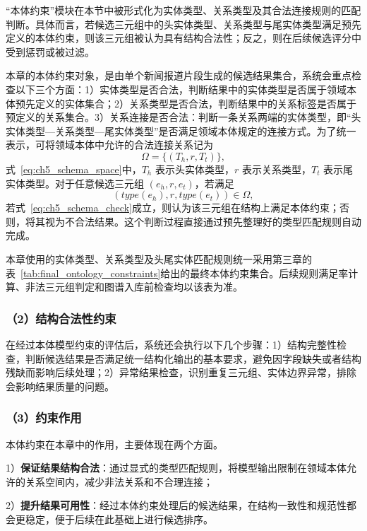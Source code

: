 “本体约束”模块在本节中被形式化为实体类型、关系类型及其合法连接规则的匹配判断。具体而言，若候选三元组中的头实体类型、关系类型与尾实体类型满足预先定义的本体约束，则该三元组被认为具有结构合法性；反之，则在后续候选评分中受到惩罚或被过滤。

本章的本体约束对象，是由单个新闻报道片段生成的候选结果集合，系统会重点检查以下三个方面：1）实体类型是否合法，判断结果中的实体类型是否属于领域本体预先定义的实体集合；2）关系类型是否合法，判断结果中的关系标签是否属于预定义的关系集合。3）关系连接是否合法：判断一条关系两端的实体类型，即“头实体类型—关系类型—尾实体类型”是否满足领域本体规定的连接方式。为了统一表示，可将领域本体中允许的合法连接关系记为
\begin{equation}
\Omega=\{(T_h,r,T_t)\},
\label{eq:ch5_schema_space}
\end{equation}
式~\eqref{eq:ch5_schema_space}中，$T_h$ 表示头实体类型，$r$ 表示关系类型，$T_t$ 表示尾实体类型。对于任意候选三元组 $(e_h,r,e_t)$，若满足
\begin{equation}
(type(e_h),r,type(e_t))\in\Omega,
\label{eq:ch5_schema_check}
\end{equation}
若式~\eqref{eq:ch5_schema_check}成立，则认为该三元组在结构上满足本体约束；否则，将其视为不合法结果。这个判断过程直接通过预先整理好的类型匹配规则自动完成。

本章使用的实体类型、关系类型及头尾实体匹配规则统一采用第三章的表~\ref{tab:final_ontology_constraints}给出的最终本体约束集合。后续规则满足率计算、非法三元组判定和图谱入库前检查均以该表为准。

\subsubsection*{（2）结构合法性约束}

在经过本体模型约束的评估后，系统还会执行以下几个步骤：1）结构完整性检查，判断候选结果是否满足统一结构化输出的基本要求，避免因字段缺失或者结构残缺而影响后续处理；2）异常结果检查，识别重复三元组、实体边界异常，排除会影响结果质量的问题。

\subsubsection*{（3）约束作用}

本体约束在本章中的作用，主要体现在两个方面。

1）\textbf{保证结果结构合法}：通过显式的类型匹配规则，将模型输出限制在领域本体允许的关系空间内，减少非法关系和不合理连接；

2）\textbf{提升结果可用性}：经过本体约束处理后的候选结果，在结构一致性和规范性都会更稳定，便于后续在此基础上进行候选排序。

